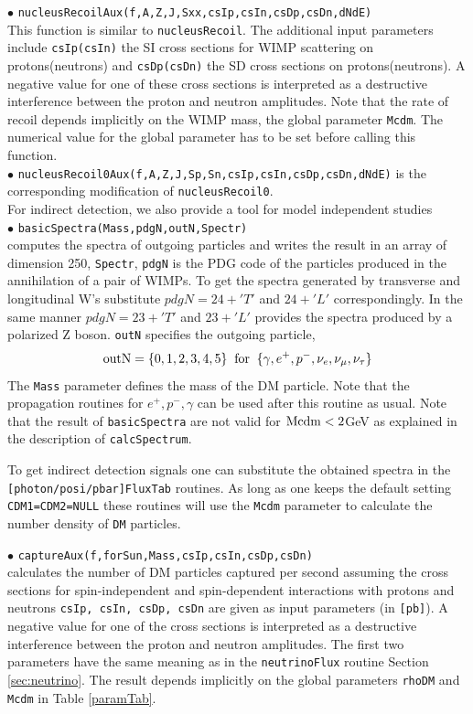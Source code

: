 \documentclass[12pt,a4paper]{article}
\begin{document}
{\noindent
$\bullet$ \verb|nucleusRecoilAux(f,A,Z,J,Sxx,csIp,csIn,csDp,csDn,dNdE)|\\
This function is similar to \verb|nucleusRecoil|. 
The additional input parameters include \verb|csIp(csIn)| the SI cross 
sections for WIMP scattering on protons(neutrons) and
\verb|csDp(csDn)| the SD cross sections on protons(neutrons). 
A negative value for one of these cross sections is interpreted as a destructive 
interference between the
proton and neutron amplitudes. Note that the rate of recoil  depends 
implicitly on the WIMP mass, the  global parameter \verb|Mcdm|.
 The numerical value for the global parameter has to be
set before calling this function.\\
\noindent
$\bullet$ \verb|nucleusRecoil0Aux(f,A,Z,J,Sp,Sn,csIp,csIn,csDp,csDn,dNdE)|
is the corresponding modification of \verb|nucleusRecoil0|.\\

For indirect detection, we also provide a tool for model independent studies\\ 
\noindent
$\bullet$ \verb|basicSpectra(Mass,pdgN,outN,Spectr)|\\
computes the spectra of outgoing particles and writes the result in an array of dimension 250, \verb|Spectr|,
\verb|pdgN| is the PDG code of the particles produced in the annihilation of a pair of 
WIMPs. To get the spectra generated by transverse and longitudinal W's substitute 
$ pdgN=24+'T'$ and $24+'L'$ correspondingly. In the same manner $pdgN=23+'T'$ and
$23+'L'$  provides the spectra produced by a polarized Z boson.
 \verb|outN|  specifies the outgoing particle,
$$ {\rm outN} = \{0,1,2,3,4,5\} \;\; {\rm for}\;\; \{\gamma,   e^+,  p^-, \nu_e,
\nu_{\mu},\nu_{\tau}\} $$
The {\tt Mass} parameter defines the mass of the DM particle.
Note that the  propagation routines for $e^+,p^-,\gamma$ can be used after 
this routine as usual. Note that the result of {\tt basicSpectra}
are not valid for ${\rm Mcdm} < 2$GeV as explained in the description of {\tt calcSpectrum}.  

To get indirect detection signals one can substitute the obtained spectra in the\\ 
{\tt [photon/posi/pbar]FluxTab} routines. As long as one keeps the default setting  {\tt CDM1=CDM2=NULL} these routines will use the {\tt Mcdm} parameter to calculate the number density of {\tt DM} particles. 
  

\noindent $\bullet$ \verb|captureAux(f,forSun,Mass,csIp,csIn,csDp,csDn)|\\
calculates the number of DM particles captured per second assuming the cross sections
for  spin-independent and spin-dependent 
interactions with protons and neutrons   {\tt csIp, csIn, csDp, csDn} are
given as input parameters (in {\tt [pb]}). 
A negative value for one of the cross sections  is interpreted as a destructive
interference between the  proton and neutron amplitudes. The first two
parameters have the same meaning as in the {\tt neutrinoFlux} routine Section \ref{sec:neutrino}. The
result  depends implicitly on the global parameters {\tt rhoDM} and {\tt
Mcdm} in Table \ref{paramTab}. 


}
\end{document}
